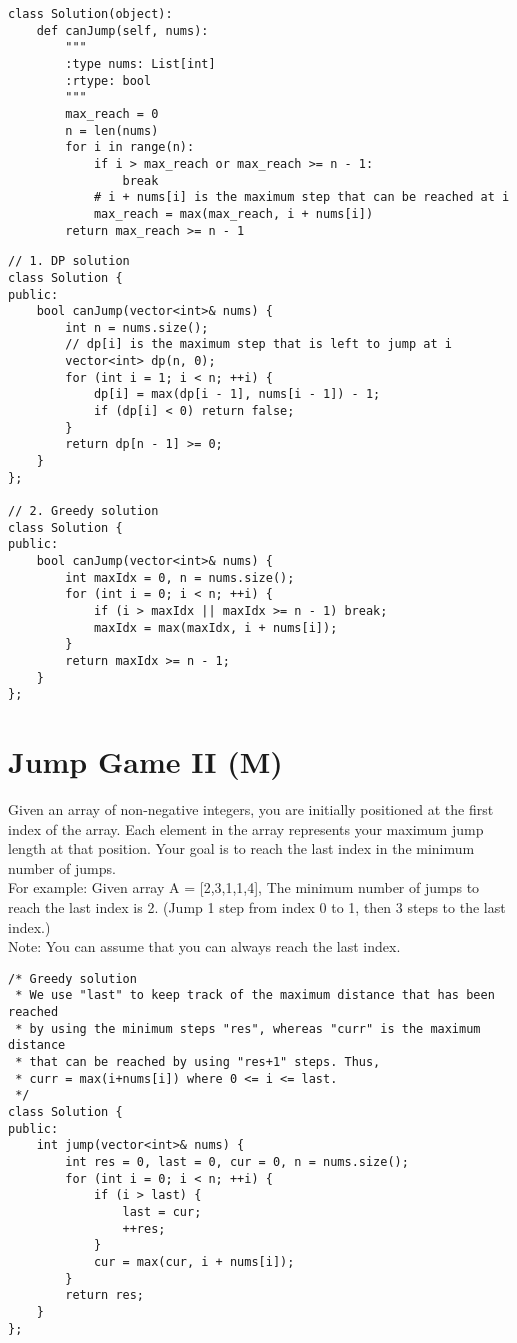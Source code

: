 \begin{lstlisting}
class Solution(object):
    def canJump(self, nums):
        """
        :type nums: List[int]
        :rtype: bool
        """
        max_reach = 0
        n = len(nums)
        for i in range(n):
            if i > max_reach or max_reach >= n - 1:
                break
            # i + nums[i] is the maximum step that can be reached at i
            max_reach = max(max_reach, i + nums[i])
        return max_reach >= n - 1
\end{lstlisting}

\begin{lstlisting}
// 1. DP solution
class Solution {
public:
    bool canJump(vector<int>& nums) {
        int n = nums.size();
        // dp[i] is the maximum step that is left to jump at i
        vector<int> dp(n, 0);
        for (int i = 1; i < n; ++i) {
            dp[i] = max(dp[i - 1], nums[i - 1]) - 1;
            if (dp[i] < 0) return false;
        }
        return dp[n - 1] >= 0;
    }
};

// 2. Greedy solution
class Solution {
public:
    bool canJump(vector<int>& nums) {
        int maxIdx = 0, n = nums.size();
        for (int i = 0; i < n; ++i) {
            if (i > maxIdx || maxIdx >= n - 1) break;
            maxIdx = max(maxIdx, i + nums[i]);
        }
        return maxIdx >= n - 1;
    }
};
\end{lstlisting}


\section{Jump Game II (M)}
Given an array of non-negative integers, you are initially positioned at the first index of the array. Each element in the array represents your maximum jump length at that position. Your goal is to reach the last index in the minimum number of jumps.\\

For example:
Given array A = [2,3,1,1,4],
The minimum number of jumps to reach the last index is 2. (Jump 1 step from index 0 to 1, then 3 steps to the last index.)\\

Note:
You can assume that you can always reach the last index.\\

\begin{lstlisting}
/* Greedy solution
 * We use "last" to keep track of the maximum distance that has been reached
 * by using the minimum steps "res", whereas "curr" is the maximum distance
 * that can be reached by using "res+1" steps. Thus,
 * curr = max(i+nums[i]) where 0 <= i <= last.
 */
class Solution {
public:
    int jump(vector<int>& nums) {
        int res = 0, last = 0, cur = 0, n = nums.size();
        for (int i = 0; i < n; ++i) {
            if (i > last) {
                last = cur;
                ++res;
            }
            cur = max(cur, i + nums[i]);
        }
        return res;
    }
};
\end{lstlisting}


